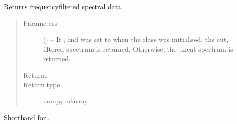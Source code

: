\documentclass[letterpaper,10pt,english]{sphinxmanual}
\begin{document}
\begin{fulllineitems}
\begin{fulllineitems}
\label{\detokenize{references/freqfilter:nmrespy.freqfilter.FrequencyFilter.get_filtered_spectrum}}
\sphinxAtStartPar
Returns frequency\sphinxhyphen{}filtered spectral data.
\begin{quote}\begin{description}
\item[{Parameters}] \leavevmode
\sphinxAtStartPar
{} (\sphinxstyleliteralemphasis{\sphinxupquote{, }}) – If , and  was set to  when the class was
initialised, the cut, filtered spectrum is returned. Otherwise,
the uncut spectrum is returned.

\item[{Returns}] \leavevmode
\sphinxAtStartPar
{}

\item[{Return type}] \leavevmode
\sphinxAtStartPar
numpy.ndarray

\end{description}\end{quote}

\end{fulllineitems}


\begin{fulllineitems}
\label{\detokenize{references/freqfilter:nmrespy.freqfilter.FrequencyFilter.get_fs}}
\sphinxAtStartPar
Shorthand for {\hyperref[\detokenize{references/freqfilter:nmrespy.freqfilter.FrequencyFilter.get_filtered_spectrum}]{}}.

\end{fulllineitems}



\end{fulllineitems}
\end{document}
